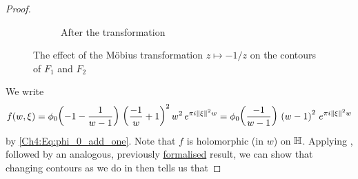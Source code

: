 \begin{proof}
\begin{figure}[htb]
\begin{subfigure}{0.4\linewidth}
            \caption{After the transformation}
        \end{subfigure}
        \caption{The effect of the Möbius transformation $z \mapsto -1/z$ on the contours of $F_1$ and $F_2$}
        \label{Ch4:Fig:Eigenfunction_Mobius_Contours}
    \end{figure}
    We write
    \begin{align*}
        f\!\left( w, \xi \right) = \phi_0\!\left( -1 - \frac{1}{w - 1} \right) \, \left( \frac{-1}{w} + 1 \right)^2 w^2 \, e^{\pi i \left\lVert \xi \right\rVert^2 w}
        = \phi_0\!\left( \frac{-1}{w - 1} \right) \, \left( w - 1 \right)^2 \, e^{\pi i \left\lVert \xi \right\rVert^2 w}
    \end{align*}
    by \eqref{Ch4:Eq:phi_0_add_one}. Note that $f$ is holomorphic (in $w$) on $\mathbb{H}$. Applying , followed by an analogous, previously \href{https://github.com/leanprover-community/mathlib4/blob/88928cefd7edb1ba61623bffd4e86389dfe1f648/Mathlib/Analysis/Complex/CauchyIntegral.lean#L245}{formalised} result, we can show that changing contours as we do in  then tells us that

\end{proof}
